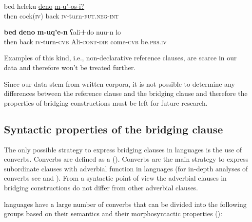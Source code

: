 \documentclass[output=paper]{LSP/langsci}
\begin{document}
\begin{exe}
	\ex	\label{ex:4ab}
	\begin{xlist}
		\ex	\label{ex:4a}
		\gll	 bed	ħeleku	\underline{deno}	\underline{m-u'-os-i?}\\
			then	cock(\textsc{iv})	back	\textsc{iv}-turn-\textsc{fut.neg-int}\\
		\glt	{}

		\ex	\label{ex:4b}
		\gll	\textbf{bed} 	\textbf{deno}		\textbf{m-uq'e-n}		ʕali-ɬ-do			nuu-n			lo\\
			then	back		\textsc{iv}-turn-\textsc{cvb}	Ali-\textsc{cont-dir}	come-\textsc{cvb}	be.\textsc{prs.iv}\\
		\glt	{}
	\end{xlist}
\end{exe}

Examples of this kind, i.e., non-declarative reference clauses, are scarce in our data and therefore won't be treated further. 

Since our data stem from written corpora, it is not possible to determine any  differences between the reference clause and the bridging clause and therefore the  properties of  bridging constructions must be left for future research.


\subsection{Syntactic properties of the bridging clause}
\label{ssec:Syntactic properties of the bridging clause}
The only possible strategy to express bridging clauses in  languages is the use of converbs. Converbs are defined as a  (\citealt[3]{Haspelmath.1995}). Converbs are the main strategy to express subordinate clauses with adverbial function in  languages (for in-depth analyses of converbs see \citealt{Comrie.Forker.Khalilova.2012} and \citealt{Forker.2013b}). From a syntactic point of view the adverbial clauses in bridging constructions do not differ from other adverbial clauses.

 languages have a large number of converbs that can be divided into the following groups based on their semantics and their morphosyntactic properties (\citealt{Comrie.Forker.Khalilova.2012}):
\end{document}
